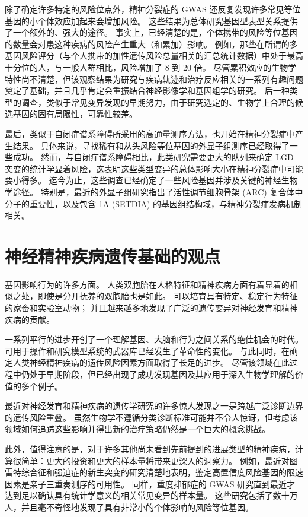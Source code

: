 除了确定许多特定的风险位点外，精神分裂症的 GWAS 还反复发现许多常见等位基因的小个体效应加起来会增加风险。 这些结果为总体研究基因型表型关系提供了一个额外的、强大的途径。 事实上，已经清楚的是，个体携带的风险等位基因的数量会对患这种疾病的风险产生重大（和累加）影响。 例如，那些在所谓的多基因风险评分（与个人携带的加性遗传风险总量相关的汇总统计数据）中处于最高十分位的人，与一般人群相比，风险增加了 8 到 20 倍。 尽管累积效应的生物学特性尚不清楚，但该观察结果为研究与疾病轨迹和治疗反应相关的一系列有趣问题奠定了基础，并且几乎肯定会重振结合神经影像学和基因组学的研究。 后一种类型的调查，类似于常见变异发现的早期努力，由于研究选定的、生物学上合理的候选基因的固有局限性，可靠性较差。

最后，类似于自闭症谱系障碍所采用的高通量测序方法，也开始在精神分裂症中产生结果。 具体来说，寻找稀有和从头风险等位基因的外显子组测序已经取得了一些成功。 然而，与自闭症谱系障碍相比，此类研究需要更大的队列来确定 LGD 突变的统计学显着风险，这表明这些类型变异的总体影响大小在精神分裂症中可能要小得多。 迄今为止，这些调查已经确定了一些风险基因并涉及关键的神经生物学途径。 特别是，最近的外显子组研究指出了活性调节细胞骨架 (ARC) 复合体中分子的重要性，以及包含 1A (SETDIA) 的基因组结构域，与精神分裂症发病机制相关。

\section{神经精神疾病遗传基础的观点}

基因影响行为的许多方面。 人类双胞胎在人格特征和精神疾病方面有着显着的相似之处，即使是分开抚养的双胞胎也是如此。 可以培育具有特定、稳定行为特征的家畜和实验室动物； 并且越来越多地发现了广泛的遗传变异对神经发育和精神疾病的贡献。

一系列平行的进步开创了一个理解基因、大脑和行为之间关系的绝佳机会的时代。 可用于操作和研究模型系统的武器库已经发生了革命性的变化。 与此同时，在确定人类神经精神疾病的遗传风险因素方面取得了长足的进步。 尽管该领域在此过程中仍处于早期阶段，但已经出现了成功发现基因及其应用于深入生物学理解的价值的多个例子。

最近对神经发育和精神疾病的遗传学研究的许多惊人发现之一是跨越广泛诊断边界的遗传风险重叠。 虽然生物学不遵循分类诊断标准可能并不令人惊讶，但考虑该领域如何追踪这些影响并得出新的治疗策略仍然是一个巨大的概念挑战。

此外，值得注意的是，对于许多其他尚未看到先前提到的进展类型的精神疾病，计算很简单：更大的投资和更大的样本量将带来更深入的洞察力。 例如，最近对图雷特综合征和强迫症的新生突变的研究清楚地表明，鉴定高置信度风险基因的限速因素是亲子三重奏测序的可用性。 同样，重度抑郁症的 GWAS 研究直到最近才达到足以确认具有统计学意义的相关常见变异的样本量。 这些研究包括了数十万人，并且毫不奇怪地发现了具有非常小的个体影响的风险等位基因。

